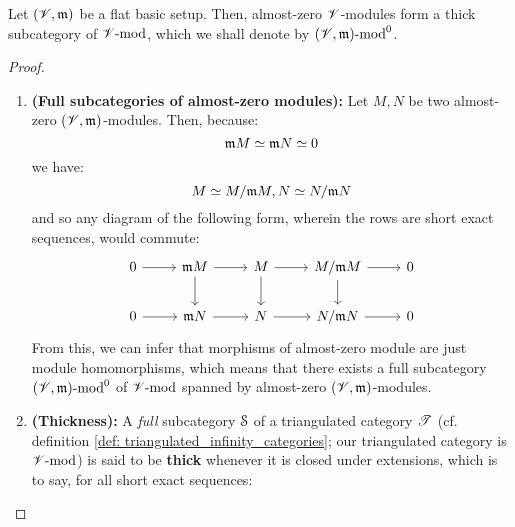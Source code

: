                 \begin{proposition} \label{prop: thick_subcategories_of_almost_zero_modules}
                    Let $(\scrV, \m)$ be a flat basic setup. Then, almost-zero $\scrV$-modules form a thick subcategory of $\scrV\mod$, which we shall denote by $(\scrV, \m)\mod^0$.
                \end{proposition}
                    \begin{proof}
                        \noindent
                        \begin{enumerate}
                            \item \textbf{(Full subcategories of almost-zero modules):} Let $M, N$ be two almost-zero $(\scrV, \m)$-modules. Then, because:
                                $$\m M \cong \m N \cong 0$$
                            we have:
                                $$M \cong M/\m M, N \cong N/\m N$$
                            and so any diagram of the following form, wherein the rows are short exact sequences, would commute:
                                $$
                                    \begin{tikzcd}
                                    	0 & {\m M} & M & {M/\m M} & 0 \\
                                    	0 & {\m N} & N & {N/ \m N} & 0
                                    	\arrow[from=1-1, to=1-2]
                                    	\arrow[from=1-2, to=1-3]
                                    	\arrow[from=1-3, to=1-4]
                                    	\arrow[from=1-4, to=1-5]
                                    	\arrow[from=2-1, to=2-2]
                                    	\arrow[from=2-2, to=2-3]
                                    	\arrow[from=2-3, to=2-4]
                                    	\arrow[from=2-4, to=2-5]
                                    	\arrow[from=1-2, to=2-2]
                                    	\arrow[from=1-3, to=2-3]
                                    	\arrow[from=1-4, to=2-4]
                                    \end{tikzcd}
                                $$
                            From this, we can infer that morphisms of almost-zero module are just module homomorphisms, which means that there exists a full subcategory $(\scrV, \m)\mod^0$ of $\scrV\mod$ spanned by almost-zero $(\scrV, \m)$-modules.
                            \item \textbf{(Thickness):} A \textit{full} subcategory $\S$ of a triangulated category $\T$ (cf. definition \ref{def: triangulated_infinity_categories}; our triangulated category is $\scrV\mod$) is said to be \textbf{thick} whenever it is closed under extensions, which is to say, for all short exact sequences:

\end{enumerate}
\end{proof}
